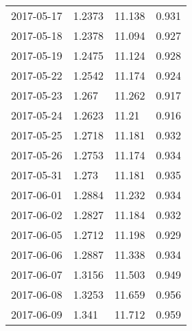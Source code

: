 \begin{center}
\begin{longtable}{r lll}
    2017-05-17 & 1.2373 & 11.138 & 0.931  \\
    2017-05-18 & 1.2378 & 11.094 & 0.927  \\
    2017-05-19 & 1.2475 & 11.124 & 0.928  \\
    2017-05-22 & 1.2542 & 11.174 & 0.924  \\
    2017-05-23 & 1.267  & 11.262 & 0.917  \\
    2017-05-24 & 1.2623 & 11.21  & 0.916  \\
    2017-05-25 & 1.2718 & 11.181 & 0.932  \\
    2017-05-26 & 1.2753 & 11.174 & 0.934  \\
    2017-05-31 & 1.273  & 11.181 & 0.935  \\
    2017-06-01 & 1.2884 & 11.232 & 0.934  \\
    2017-06-02 & 1.2827 & 11.184 & 0.932  \\
    2017-06-05 & 1.2712 & 11.198 & 0.929  \\
    2017-06-06 & 1.2887 & 11.338 & 0.934  \\
    2017-06-07 & 1.3156 & 11.503 & 0.949  \\
    2017-06-08 & 1.3253 & 11.659 & 0.956  \\
    2017-06-09 & 1.341  & 11.712 & 0.959  \\
    \hline \hline
\end{longtable}
\end{center}
